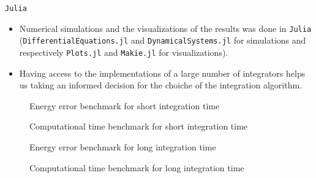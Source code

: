 \documentclass{beamer}
\begin{document}

\begin{frame}{\texttt{Julia}}
	\begin{itemize}
		\item Numerical simulations and the visualizations of the
		results was done in \texttt{Julia} (\texttt{DifferentialEquations.jl}
		and \texttt{DynamicalSystems.jl} for simulations and respectively
		\texttt{Plots.jl} and \texttt{Makie.jl} for visualizations).
		\item Having access to the implementations of a large
		number of integrators helps us taking an informed decision
		for the choiche of the integration algorithm.
	\end{itemize}
\end{frame}


\begin{frame}
	\begin{figure}
		
		\caption{Energy error benchmark for short integration time}
	\end{figure}
\end{frame}


\begin{frame}
	\begin{figure}
		
		\caption{Computational time benchmark for short integration time}
	\end{figure}
\end{frame}


\begin{frame}
	\begin{figure}
		
		\caption{Energy error benchmark for long integration time}
	\end{figure}
\end{frame}


\begin{frame}
	\begin{figure}
		
		\caption{Computational time benchmark for long integration time}
	\end{figure}
\end{frame}
\end{document}
